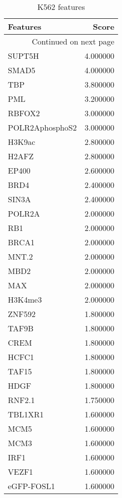 \begin{longtable}{lr}
\caption{K562 features}\\
\toprule
        Features &     Score \\
\midrule
\endhead
\midrule
\multicolumn{2}{r}{{Continued on next page}} \\
\midrule
\endfoot

\bottomrule
\endlastfoot
          SUPT5H &  4.000000 \\
           SMAD5 &  4.000000 \\
             TBP &  3.800000 \\
             PML &  3.200000 \\
          RBFOX2 &  3.000000 \\
 POLR2AphosphoS2 &  3.000000 \\
          H3K9ac &  2.800000 \\
           H2AFZ &  2.800000 \\
           EP400 &  2.600000 \\
            BRD4 &  2.400000 \\
           SIN3A &  2.400000 \\
          POLR2A &  2.000000 \\
             RB1 &  2.000000 \\
           BRCA1 &  2.000000 \\
           MNT.2 &  2.000000 \\
            MBD2 &  2.000000 \\
             MAX &  2.000000 \\
         H3K4me3 &  2.000000 \\
          ZNF592 &  1.800000 \\
           TAF9B &  1.800000 \\
            CREM &  1.800000 \\
           HCFC1 &  1.800000 \\
           TAF15 &  1.800000 \\
            HDGF &  1.800000 \\
          RNF2.1 &  1.750000 \\
         TBL1XR1 &  1.600000 \\
            MCM5 &  1.600000 \\
            MCM3 &  1.600000 \\
            IRF1 &  1.600000 \\
           VEZF1 &  1.600000 \\
      eGFP-FOSL1 &  1.600000 \\

\end{longtable}
